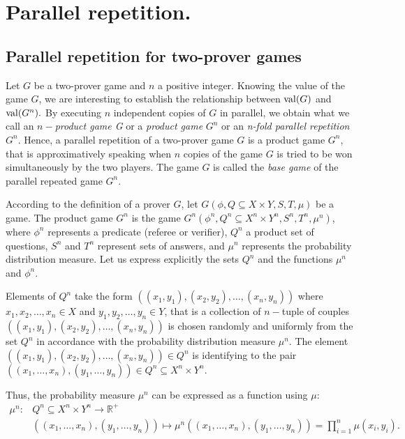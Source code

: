 \section{Parallel repetition.}

\subsection{Parallel repetition for  two-prover games}

Let $G$ be a two-prover game and $n$ a positive integer. Knowing the value of the game $G$, we are interesting
to establish the relationship between $\mathrm{val} (G)$ and $\mathrm{val} (G^n).$  By executing  $n$ independent copies of $G$ in parallel, we obtain what we call an $n-$\textit{product game G} or a \textit{product game} $G^n$ or an \textit{n-fold parallel repetition} $G^n.$ Hence, a parallel repetition of a two-prover game $G$ is a product game $G^n$, that is approximatively
speaking when $n$ copies of the game $G$ is tried to be won simultaneously by the two players. The game $G$ is called  the \textit{base game} of the parallel repeated game $G^n.$

According to the definition of a prover $G$, let $G(\phi, Q \subseteq X \times Y, S, T, \mu)$ be a game. The product game $G^n$ is the game $G^n(\phi^n, Q^n\subseteq X^n \times Y^n, S^n, T^n, \mu^n)$, where $\phi^n$ represents a predicate (referee or verifier), $Q^n$ a product set of questions, $S^n$ and $T^n$ represent sets of answers, and $\mu^n$ represents the probability distribution measure. Let us express explicitly the sets $Q^n$ and the functions $\mu^n$ and $\phi^n.$

 Elements of $Q^n$ take the form $((x_1, y_1),(x_2,y_2 ), \ldots, (x_n, y_n))$ where $x_1, x_2, \ldots, x_n \in X$ and $y_1, y_2, \ldots, y_n \in Y$, that is a collection of $n-$tuple of couples  $((x_1, y_1),(x_2,y_2 ), \ldots, (x_n, y_n))$ is chosen randomly and uniformly from the set $Q^n$ in accordance with the probability distribution measure $\mu^n $. The element  $((x_1, y_1),(x_2,y_2 ), \ldots, (x_n, y_n)) \in Q^n$ is identifying to the pair $((x_1,\ldots, x_n), (y_1, \ldots, y_n)) \in Q^n \subseteq X^n \times Y^n.$
 
Thus, the probability measure $\mu^n$ can be expressed as a function using $\mu$: 
 \begin{align*}
\mu^n:  & Q^n \subseteq X^n \times Y^n  \longrightarrow \mathbb{R}^+ \\
  & ((x_1,\ldots, x_n), (y_1,\ldots, y_n)) \longmapsto \mu^n((x_1,\ldots, x_n), (y_1,\ldots, y_n))=\prod_{i=1}^n  \mu (x_i, y_i). 
 \end{align*}
 
